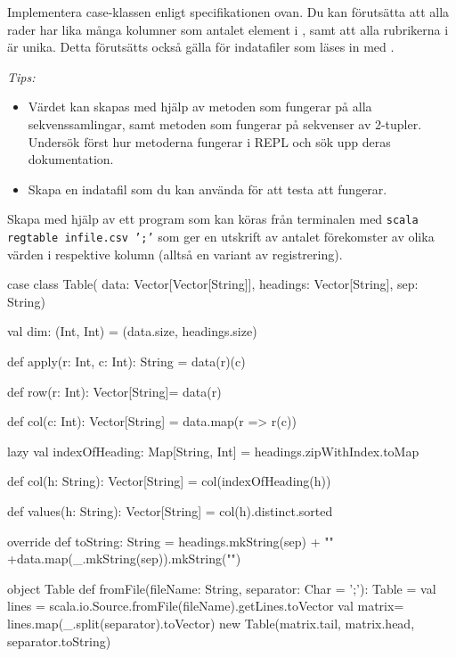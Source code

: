 \Subtask Implementera case-klassen  enligt specifikationen ovan. Du kan förutsätta att alla rader har lika många kolumner som antalet element i , samt att alla rubrikerna i  är unika. Detta förutsätts också gälla för indatafiler som läses in med .

\emph{Tips:}
\begin{itemize}%
\item Värdet  kan skapas med hjälp av metoden  som fungerar på alla sekvenssamlingar, samt metoden  som fungerar på sekvenser av 2-tupler. Undersök först hur metoderna fungerar i REPL och sök upp deras dokumentation.
\item Skapa en indatafil som du kan använda för att testa att  fungerar.
\end{itemize}

\Subtask Skapa med hjälp av  ett program som kan köras från terminalen med \texttt{scala regtable infile.csv ';'} som ger en utskrift av antalet förekomster av olika värden i respektive kolumn (alltså en variant av registrering).

\SOLUTION

\TaskSolved \what

\SubtaskSolved  \begin{CodeSmall}
case class Table(
	data: Vector[Vector[String]],
	headings: Vector[String],
	sep: String){

	val dim: (Int, Int) = (data.size, headings.size)

	def apply(r: Int, c: Int): String = data(r)(c)

	def row(r: Int): Vector[String]= data(r)

	def col(c: Int): Vector[String] = data.map(r => r(c))

	lazy val indexOfHeading: Map[String, Int] = headings.zipWithIndex.toMap

	def col(h: String): Vector[String] = col(indexOfHeading(h))

	def values(h: String): Vector[String] = col(h).distinct.sorted

	override def toString: String =
		headings.mkString(sep) + "\n" +data.map(_.mkString(sep)).mkString("\n")
}
object Table {
	def fromFile(fileName: String, separator: Char = ';'): Table = {
		val lines = scala.io.Source.fromFile(fileName).getLines.toVector
		val matrix= lines.map(_.split(separator).toVector)
		new Table(matrix.tail, matrix.head, separator.toString)
	}
}
\end{CodeSmall}

